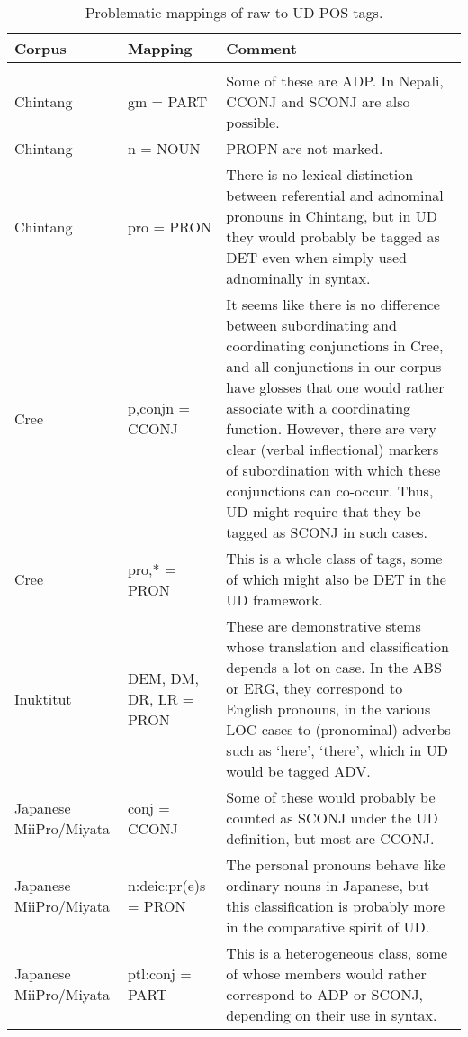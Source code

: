 \documentclass[a4paper, 11pt]{book}
\begin{document}
\begin{longtable}{lp{.2\linewidth}p{.5\linewidth}}
	\toprule
		\textbf{Corpus} & \textbf{Mapping} 	& \textbf{Comment} \\
	\midrule
	\endhead
		
	\bottomrule\\[-0.15cm]
	\caption{Problematic mappings of raw to UD POS tags.}
	\endfoot
		Chintang                  & gm = PART                 & Some of these are ADP. In Nepali, CCONJ and SCONJ are also possible. \\
		Chintang                  & n = NOUN                  & PROPN are not marked. \\
		Chintang                  & pro = PRON                & There is no lexical distinction between referential and adnominal pronouns in Chintang, but in UD they would probably be tagged as DET even when simply used adnominally in syntax. \\
		Cree                      & p,conjn = CCONJ           & It seems like there is no difference between subordinating and coordinating conjunctions in Cree, and all conjunctions in our corpus have glosses that one would rather associate with a coordinating function. However, there are very clear (verbal inflectional) markers of subordination with which these conjunctions can co-occur. Thus, UD might require that they be tagged as SCONJ in such cases. \\
		Cree                      & pro,* = PRON              & This is a whole class of tags, some of which might also be DET in the UD framework. \\ 
		Inuktitut                 & DEM, DM, DR, LR = PRON    & These are demonstrative stems whose translation and classification depends a lot on case. In the ABS or ERG, they correspond to English pronouns, in the various LOC cases to (pronominal) adverbs such as `here', `there', which in UD would be tagged ADV. \\ 
		Japanese MiiPro/Miyata    & conj = CCONJ              & Some of these would probably be counted as SCONJ under the UD definition, but most are CCONJ. \\
		Japanese MiiPro/Miyata    & n:deic:pr(e)s \hspace{2cm} = PRON      & The personal pronouns behave like ordinary nouns in Japanese, but this classification is probably more in the comparative spirit of UD. \\
		Japanese MiiPro/Miyata    & ptl:conj = PART           & This is a heterogeneous class, some of whose members would rather correspond to ADP or SCONJ, depending on their use in syntax. \\

\end{longtable}
\end{document}
